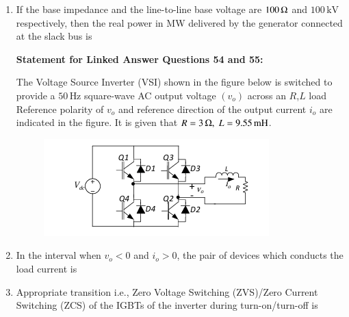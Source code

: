\documentclass[journal,12pt,onecolumn]{IEEEtran}
\theoremstyle{remark}
\begin{document}
\begin{enumerate}
\item If the base impedance and the line-to-line base voltage are $100 \,\ohm$ and $100 \,\text{kV}$ respectively, then the real power in MW delivered by the generator connected at the slack bus is
\begin{enumerate}
\end{enumerate}


\textbf{Statement for Linked Answer Questions 54 and 55:}

The Voltage Source Inverter (VSI) shown in the figure below is switched to provide a $50\,\text{Hz}$ square-wave AC output voltage $(v_o)$ across an $R$,$L$ load Reference polarity of $v_o$ and reference direction of the output current $i_o$ are indicated in the figure. It is given that $R = 3\,\ohm, \; L = 9.55\,\text{mH}$.
\begin{figure}[h]
    \centering
    \includegraphics[width=0.5\columnwidth]{figs/24.png}
    \label{fig:placeholder}
\end{figure}



\item In the interval when $v_o < 0$ and $i_o > 0$, the pair of devices which conducts the load current is
\begin{enumerate}
\end{enumerate}

\item Appropriate transition i.e., Zero Voltage Switching (ZVS)/Zero Current Switching (ZCS) of the IGBTs of the inverter during turn-on/turn-off is
\begin{enumerate}


\end{enumerate}
\end{enumerate}
\end{document}
